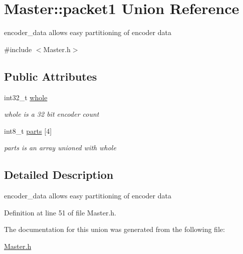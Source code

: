 \hypertarget{unionMaster_1_1packet1}{\section{Master\-:\-:packet1 Union Reference}
\label{unionMaster_1_1packet1}
}


encoder\-\_\-data allows easy partitioning of encoder data  




{\ttfamily \#include $<$Master.\-h$>$}

\subsection*{Public Attributes}
\begin{DoxyCompactItemize}
\item 
\hypertarget{unionMaster_1_1packet1_a97cea3aeb07a0b3fc8e061f845d311a9}{int32\-\_\-t \hyperlink{unionMaster_1_1packet1_a97cea3aeb07a0b3fc8e061f845d311a9}{whole}}\label{unionMaster_1_1packet1_a97cea3aeb07a0b3fc8e061f845d311a9}

\begin{DoxyCompactList}\small\item\em whole is a 32 bit encoder count \end{DoxyCompactList}\item 
\hypertarget{unionMaster_1_1packet1_aa6114b427893df62cdfdee4ef6b8e971}{int8\-\_\-t \hyperlink{unionMaster_1_1packet1_aa6114b427893df62cdfdee4ef6b8e971}{parts} \mbox{[}4\mbox{]}}\label{unionMaster_1_1packet1_aa6114b427893df62cdfdee4ef6b8e971}

\begin{DoxyCompactList}\small\item\em parts is an array unioned with whole \end{DoxyCompactList}\end{DoxyCompactItemize}


\subsection{Detailed Description}
encoder\-\_\-data allows easy partitioning of encoder data 

Definition at line 51 of file Master.\-h.



The documentation for this union was generated from the following file\-:\begin{DoxyCompactItemize}
\item 
\hyperlink{Master_8h}{Master.\-h}\end{DoxyCompactItemize}
